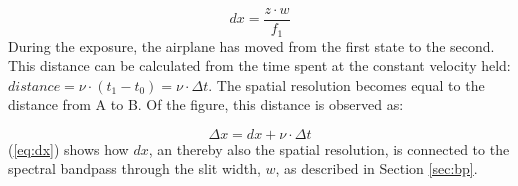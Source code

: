 \begin{equation}
    dx = \frac{z \cdot w}{f_1}
    \label{eq:dx}
\end{equation}
During the exposure, the airplane has moved from the first state to the second. This distance can be calculated from the time spent at the constant velocity held: $distance = \nu \cdot (t_1 - t_0) = \nu \cdot \Delta t$. The spatial resolution becomes equal to the distance from A to B. Of the figure, this distance is observed as: 

\begin{equation}
    \Delta x = dx + \nu \cdot \Delta t
    \label{eq:spares}
\end{equation}
\noindent
(\ref{eq:dx}) shows how $dx$, an thereby also the spatial resolution, is connected to the spectral bandpass through the slit width, $w$, as described in Section \ref{sec:bp}. 




